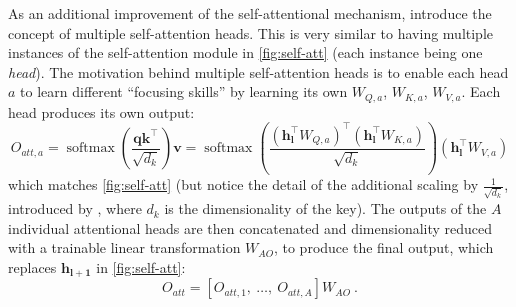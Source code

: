 \documentclass[bsc,frontabs,twoside,singlespacing,parskip,deptreport]{infthesis}
\DeclareMathOperator{\softmax}{softmax}
\begin{document}
{{{      %
      As an additional improvement of the self-attentional mechanism, \citeauthor{Vaswani_2017} introduce the concept of multiple self-attention heads. This is very similar to having multiple instances of the self-attention module in \autoref{fig:self-att} (each instance being one \textit{head}). The motivation behind multiple self-attention heads is to enable each head $a$ to learn different ``focusing skills'' by learning its own $W_{Q,a}$, $W_{K,a}$, $W_{V,a}$. Each head produces its own output:
      \begin{equation}
      O_{att,a} = \softmax(\frac{\bm{q}\bm{k^\top}}{\sqrt{d_k}})\bm{v} = \softmax(\frac{(\bm{h_l^\top}W_{Q,a})^\top(\bm{h_l^\top}W_{K,a})}{\sqrt{d_k}})(\bm{h_l^\top}W_{V,a})
      \end{equation}
      which matches \autoref{fig:self-att} (but notice the detail of the additional scaling by $\frac{1}{\sqrt{d_k}}$, introduced by \citeauthor{Vaswani_2017}, where $d_k$ is the dimensionality of the key).
      The outputs of the $A$ individual attentional heads are then concatenated and dimensionality reduced with a trainable linear transformation $W_{AO}$, to produce the final output, which replaces $\bm{h_{l+1}}$ in \autoref{fig:self-att}:
      \begin{equation}
      O_{att} = [O_{att, 1},\ \ldots,\ O_{att, A}]W_{AO}\ .
      \end{equation}
      
}}}
\end{document}
